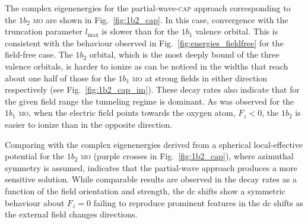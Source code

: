 The complex eigenenergies for the partial-wave-\textsc{cap} approach
corresponding to the $1b_{2}$ \textsc{mo} are shown in
Fig.~\ref{fig:1b2_cap}. In this case, convergence with the truncation
parameter $l_{\mathrm{max}}$ is slower than for the $1b_{1}$ valence
orbital. This is consistent with the behaviour observed in
Fig.~\ref{fig:energies_fieldfree} for the field-free case. The
$1b_{2}$ orbital, which is the most deeply bound of the three valence
orbitals, is harder to ionize as can be noticed in the widths that
reach about one half of those for the $1b_{1}$ \textsc{mo} at strong
fields in either direction respectively (see
Fig.~\ref{fig:1b2_cap_im}). These decay rates also indicate that for
the given field range the tunneling regime is dominant. As was
observed for the $1b_{1}$ \textsc{mo}, when the electric field points
towards the oxygen atom, $F_{z} < 0$, the $1b_{2}$ is easier to ionize
than in the opposite direction.



Comparing with the complex eigenenergies derived from a spherical
local-effective potential for the $1b_{2}$ \textsc{mo} (purple crosses
in Fig.~\ref{fig:1b2_cap}), where azimuthal symmetry is assumed,
indicates that the partial-wave approach produces a more sensitive
solution. While comparable results are observed in the decay rates as
a function of the field orientation and strength, the dc shifts show a
symmetric behaviour about $F_{z} = 0$ failing to reproduce prominent
features in the dc shifts as the external field changes directions.




